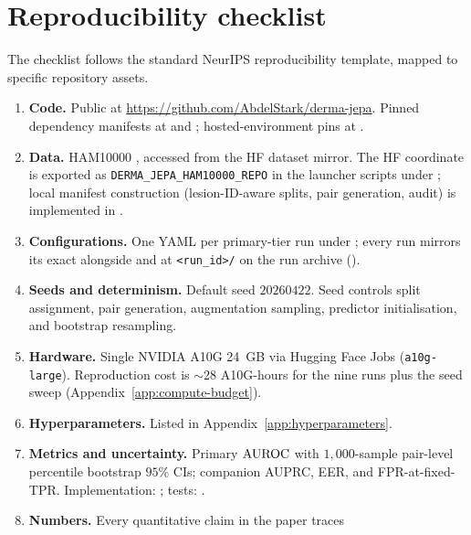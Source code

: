\section{Reproducibility checklist}
\label{app:reproducibility-checklist}

The checklist follows the standard NeurIPS reproducibility template,
mapped to specific repository assets.

\begin{enumerate}[leftmargin=2em]
\item \textbf{Code.} Public at
      \url{https://github.com/AbdelStark/derma-jepa}.
      Pinned dependency manifests at  and
      ; hosted-environment pins at
      .
\item \textbf{Data.} HAM10000 \citep{tschandl2018ham10000}, accessed
      from the  HF dataset mirror. The HF
      coordinate is exported as \texttt{DERMA\_JEPA\_HAM10000\_REPO} in
      the launcher scripts under ; local manifest
      construction (lesion-ID-aware splits, pair generation, audit) is
      implemented in .
\item \textbf{Configurations.} One YAML per primary-tier run under
      ; every run mirrors its exact
       alongside  and
       at \texttt{<run\_id>/} on the run
      archive (\runarchive).
\item \textbf{Seeds and determinism.} Default seed $20260422$. Seed
      controls split assignment, pair generation, augmentation
      sampling, predictor initialisation, and bootstrap resampling.
\item \textbf{Hardware.} Single NVIDIA A10G 24~GB via Hugging Face Jobs
      (\texttt{a10g-large}). Reproduction cost is $\sim$28 A10G-hours
      for the nine runs plus the seed sweep
      (Appendix~\ref{app:compute-budget}).
\item \textbf{Hyperparameters.} Listed in
      Appendix~\ref{app:hyperparameters}.
\item \textbf{Metrics and uncertainty.} Primary $\mathrm{AUROC}$ with
      $1{,}000$-sample pair-level percentile bootstrap $95\%$ CIs;
      companion AUPRC, EER, and FPR-at-fixed-TPR. Implementation:
      ; tests:
      .
\item \textbf{Numbers.} Every quantitative claim in the paper traces

\end{enumerate}
